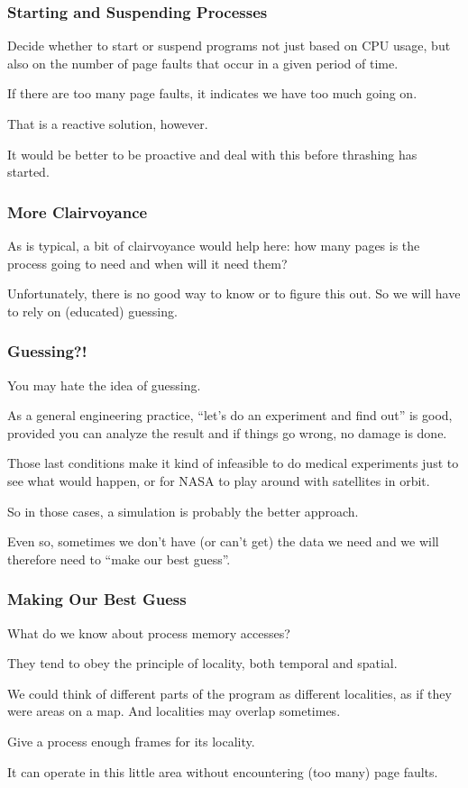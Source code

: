 \begin{frame}
\frametitle{Starting and Suspending Processes}

Decide whether to start or suspend programs not just based on CPU usage, but also on the number of page faults that occur in a given period of time. 

If there are too many page faults, it indicates we have too much going on. 

That is a reactive solution, however. 

It would be better to be proactive and deal with this before thrashing has started.


\end{frame}

\begin{frame}
\frametitle{More Clairvoyance}

As is typical, a bit of clairvoyance would help here: how many pages is the process going to need and when will it need them? 

Unfortunately, there is no good way to know or to figure this out. So we will have to rely on (educated) guessing.

\end{frame}

\begin{frame}
\frametitle{Guessing?!}

You may hate the idea of guessing. 

As a general engineering practice, ``let's do an experiment and find out'' is good, provided you can analyze the result and if things go wrong, no damage is done. 

Those last conditions make it kind of infeasible to do medical experiments just to see what would happen, or for NASA to play around with satellites in orbit. 

So in those cases, a simulation is probably the better approach. 

Even so, sometimes we don't have (or can't get) the data we need and we will therefore need to ``make our best guess''.


\end{frame}

\begin{frame}
\frametitle{Making Our Best Guess}

What do we know about process memory accesses? 

They tend to obey the principle of locality, both temporal and spatial.

We could think of different parts of the program as different localities, as if they were areas on a map. And localities may overlap sometimes. 

Give a process enough frames for its locality. 

It can operate in this little area without encountering (too many) page faults.


\end{frame}

